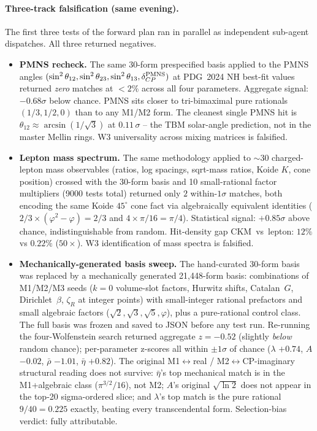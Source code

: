 \documentclass[11pt]{article}
\begin{document}
\paragraph{Three-track falsification (same evening).}
The first three tests of the forward plan ran in parallel as
independent sub-agent dispatches.  All three returned negatives.

\begin{itemize}
\setlength\itemsep{2pt}
\item \textbf{PMNS recheck.}  The same 30-form prespecified basis
applied to the PMNS angles
$(\sin^2\theta_{12}, \sin^2\theta_{23}, \sin^2\theta_{13},
\delta_{CP}^{\rm PMNS})$ at PDG~2024 NH best-fit values returned
\emph{zero} matches at $<2\%$ across all four parameters.  Aggregate
signal: $-0.68\sigma$ below chance.  PMNS sits closer to tri-bimaximal
pure rationals $(1/3, 1/2, 0)$ than to any M1/M2 form.  The cleanest
single PMNS hit is $\theta_{12}\approx \arcsin(1/\sqrt{3})$ at
$0.11\,\sigma$ -- the TBM solar-angle prediction, not in the master
Mellin rings.  W3 universality across mixing matrices is falsified.


\item \textbf{Lepton mass spectrum.}  The same methodology applied to
$\sim$30 charged-lepton mass observables (ratios, log spacings,
sqrt-mass ratios, Koide $K$, cone position) crossed with the 30-form
basis and 10 small-rational factor multipliers (9000 tests total)
returned only $2$ within-$1\sigma$ matches, both encoding the same
Koide $45^\circ$ cone fact via algebraically equivalent identities
($2/3 \times (\varphi^2 - \varphi) = 2/3$ and
$4 \times \pi/16 = \pi/4$).  Statistical signal: $+0.85\sigma$ above
chance, indistinguishable from random.  Hit-density gap CKM~vs~lepton:
$12\%$ vs $0.22\%$ ($50\times$).  W3 identification of mass spectra
is falsified.

\item \textbf{Mechanically-generated basis sweep.}  The hand-curated
30-form basis was replaced by a mechanically generated 21,448-form
basis: combinations of M1/M2/M3 seeds ($k = 0$ volume-slot factors, Hurwitz
shifts, Catalan~$G$, Dirichlet~$\beta$, $\zeta_R$ at integer points)
with small-integer rational prefactors and small algebraic factors
($\sqrt{2},\sqrt{3},\sqrt{5},\varphi$), plus a pure-rational control
class.  The full basis was frozen and saved to JSON before any test
run.  Re-running the four-Wolfenstein search returned aggregate
$z = -0.52$ (slightly \emph{below} random chance); per-parameter
z-scores all within $\pm 1\sigma$ of chance ($\lambda$ $+0.74$,
$A$ $-0.02$, $\bar\rho$ $-1.01$, $\bar\eta$ $+0.82$).  The original
M1$\leftrightarrow$real / M2$\leftrightarrow$CP-imaginary structural
reading does not survive: $\bar\eta$'s top mechanical match is in the
M1+algebraic class ($\pi^{3/2}/16$), not M2; $A$'s original
$\sqrt{\ln 2}$ does not appear in the top-20 sigma-ordered slice; and
$\lambda$'s top match is the pure rational $9/40 = 0.225$ exactly,
beating every transcendental form.  Selection-bias verdict: fully
attributable.
\end{itemize}
\end{document}

